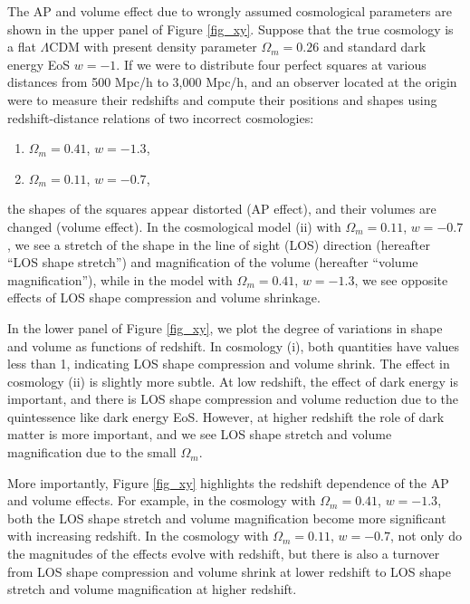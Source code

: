 \documentclass[useAMS,usenatbib]{mn2e}
\begin{document}
The AP and volume effect due to wrongly assumed cosmological parameters are shown in the upper panel of Figure \ref{fig_xy}.
Suppose that the true cosmology is a flat $\Lambda$CDM with present density parameter $\Omega_m=0.26$
and standard dark energy EoS $w=-1$.
If we were to distribute four perfect squares at various distances from 500 Mpc/h to 3,000 Mpc/h,
and an observer located at the origin were to measure their redshifts and compute their positions and shapes 
using redshift-distance relations of two incorrect cosmologies:
\begin{enumerate}
 \item $\Omega_m=0.41$, $w=-1.3$,
 \item $\Omega_m=0.11$, $w=-0.7$,
\end{enumerate}
the shapes of the squares appear distorted (AP effect),
and their volumes are changed (volume effect).
In the cosmological model (ii) with $\Omega_m=0.11$, $w=-0.7$, we see a stretch of the shape in the line of sight (LOS) direction (hereafter ``LOS shape stretch'')
and magnification of the volume (hereafter ``volume magnification''), 
while in the model with $\Omega_m=0.41$, $w=-1.3$, we see opposite effects of LOS shape compression and volume shrinkage.

In the lower panel of Figure \ref{fig_xy}, we plot the degree of variations in shape and volume as functions of redshift. 
In cosmology (i), both quantities have values less than 1, 
indicating LOS shape compression and volume shrink.
The effect in cosmology (ii) is slightly more subtle. At low redshift, the effect of dark energy is important, 
and there is LOS shape compression and volume reduction due to the quintessence like dark energy EoS.
However, at higher redshift the role of dark matter is more important, and we see LOS shape stretch and volume magnification due to the small $\Omega_m$.

More importantly, Figure \ref{fig_xy} highlights the redshift dependence of the AP and volume effects. 
For example, in the cosmology with $\Omega_m=0.41$, $w=-1.3$, 
both the LOS shape stretch and volume magnification become more significant with increasing redshift.
In the cosmology with $\Omega_m=0.11$, $w=-0.7$,
not only do the magnitudes of the effects evolve with redshift,
but there is also a turnover from LOS shape compression and volume shrink at lower redshift to LOS shape stretch and volume magnification at higher redshift.
\end{document}
